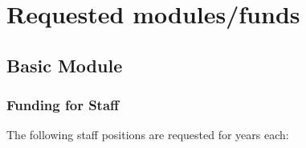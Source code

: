 \section{Requested modules/funds}

\subsection{Basic Module}

\subsubsection{Funding for Staff}
\begin{funds}
The following staff positions are requested for  years each:


\end{funds}


